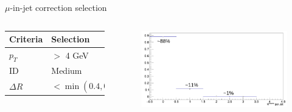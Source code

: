 \begin{frame}{$\mu$-in-jet correction selection}

\begin{columns}
\begin{table}[h]
    \centering
    \begin{tabular}{ll}
    \hline\hline
        Criteria & Selection \\
    \hline    
        $p_T$ & $>$ 4 GeV \\
        ID & Medium \\
        $\Delta R$ & $< \min(0.4, 0.004 + 10/p_T)$ \\
        \hline\hline
    \end{tabular}
\end{table}

\begin{figure}
    \centering
    \includegraphics[width=1.\textwidth]{BackUp/Part3/Img/Number_of_muon.png}
\end{figure}
\end{columns}
\end{frame}

